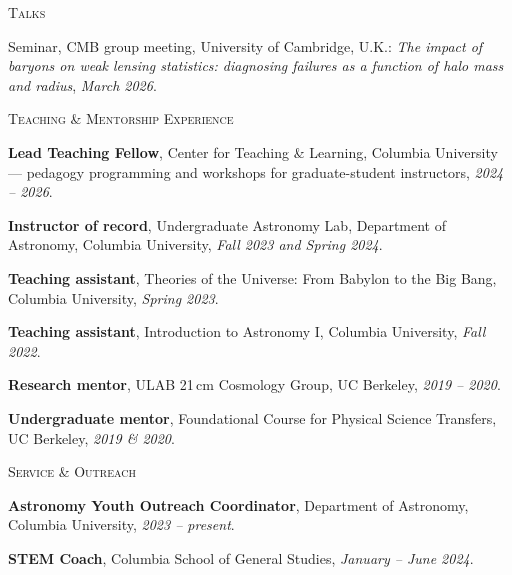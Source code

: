 \documentclass[11pt,letterpaper]{article}
\newcommand{\cvsection}[1]{%
  \vspace{1.05em}%
  {\color{head}\large\scshape #1}\par
  \vspace{-0.5em}{\color{rulec}\rule{\linewidth}{1.1pt}}\par
  \vspace{0.15em}%
}
\newenvironment{tightlist}{%
  \begin{list}{\textbullet}{%
    \setlength{\leftmargin}{1.3em}%
    \setlength{\itemsep}{0.3em}%
    \setlength{\parsep}{0pt}%
    \setlength{\topsep}{0.2em}}%
}{\end{list}}
\begin{document}
\cvsection{Talks}
\begin{tightlist}
  \item Seminar, CMB group meeting, University of Cambridge, U.K.:
    \textit{The impact of baryons on weak lensing statistics: diagnosing failures as a function of
    halo mass and radius}, {\itshape March 2026}.
\end{tightlist}

\cvsection{Teaching \& Mentorship Experience}
\begin{tightlist}
  \item \textbf{Lead Teaching Fellow}, Center for Teaching \& Learning, Columbia University ---
    pedagogy programming and workshops for graduate-student instructors, {\itshape 2024 -- 2026}.
  \item \textbf{Instructor of record}, Undergraduate Astronomy Lab, Department of Astronomy,
    Columbia University, {\itshape Fall 2023 and Spring 2024}.
  \item \textbf{Teaching assistant}, Theories of the Universe: From Babylon to the Big Bang,
    Columbia University, {\itshape Spring 2023}.
  \item \textbf{Teaching assistant}, Introduction to Astronomy I, Columbia University,
    {\itshape Fall 2022}.
  \item \textbf{Research mentor}, ULAB 21\,cm Cosmology Group, UC Berkeley,
    {\itshape 2019 -- 2020}.
  \item \textbf{Undergraduate mentor}, Foundational Course for Physical Science Transfers,
    UC Berkeley, {\itshape 2019 \& 2020}.
\end{tightlist}

\cvsection{Service \& Outreach}
\begin{tightlist}
  \item \textbf{Astronomy Youth Outreach Coordinator}, Department of Astronomy, Columbia University,
    {\itshape 2023 -- present}.
  \item \textbf{STEM Coach}, Columbia School of General Studies, {\itshape January -- June 2024}.
\end{tightlist}
\end{document}
